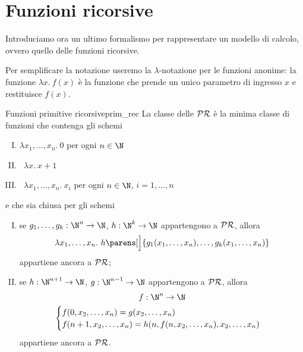 \section{Funzioni ricorsive}

Introduciamo ora un ultimo formalismo per rappresentare un modello di calcolo, ovvero quello delle funzioni ricorsive.

Per semplificare la notazione useremo la $\lambda$-notazione per le funzioni anonime: la funzione $\lambda x.\ f(x)$ è la funzione che prende un unico parametro di ingresso $x$ e restituisce $f(x)$.   

\begin{definition}
    {Funzioni primitive ricorsive}{prim_rec}
    La classe delle  $\mathcal{PR}$ è la minima classe di funzioni che contenga gli schemi
    \begin{enumerate}[I.]
        \item {} \qquad\qquad $\lambda x_1, \dots, x_n.\ 0$ \quad per ogni $n \in \N$ 
        \item {} \quad\, $\lambda x.\ x+1$
        \item {} \quad\, $\lambda x_1, \dots, x_n.\ x_i$ \quad per ogni $n \in \N$, $i = 1, \dots, n$
    \end{enumerate}
    e che sia chiusa per gli schemi
    \begin{enumerate}[I., start=4]
        \item {} se $g_1, \dots, g_k : \N^n \to \N$, $h : \N^k \to \N$ appartengono a $\mathcal{PR}$, allora \[
            \lambda x_1, \dots, x_n.\ h\parens[\Big]{g_1(x_1, \dots, x_n), \dots, g_k(x_1, \dots, x_n)}
        \] appartiene ancora a $\mathcal{PR}$;
        \item {} se $h : \N^{n+1} \to \N$, $g : \N^{n-1} \to \N$ appartengono a $\mathcal{PR}$, allora \begin{gather*}
            f : \N^n \to \N \\
            \begin{cases}
                f(0, x_2, \dots, x_n) = g(x_2, \dots, x_n)\\
                f(n+1, x_2, \dots, x_n) = h(n, f(n, x_2, \dots, x_n), x_2, \dots, x_n)
            \end{cases}
        \end{gather*}   
        appartiene ancora a $\mathcal{PR}$. 
    \end{enumerate}
\end{definition}


